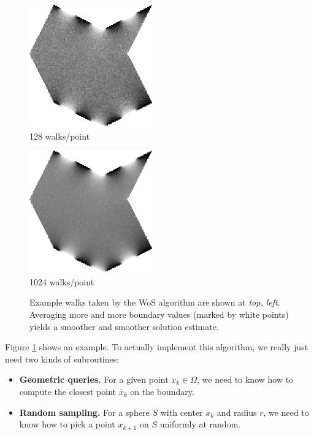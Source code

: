 \documentclass{article}
\newcommand{\figlabel}[1]{\textsf{#1}}
\newcommand{\figloc}[1]{\textit{#1}}
\renewcommand{\vec}[1]{#1}
\begin{document}
\begin{figure}[h!]
   \begin{minipage}{150pt}
      \centering
      \includegraphics[width=150pt]{images/WoSt-128wpp.png} \\
      \figlabel{128 walks/point}
   \end{minipage}
   \begin{minipage}{150pt}
      \centering
      \includegraphics[width=150pt]{images/WoSt-1024wpp.png} \\
      \figlabel{1024 walks/point}
   \end{minipage}
   \caption{Example walks taken by the WoS algorithm are shown at \figloc{top, left}.  Averaging more and more boundary values (marked by white points) yields a smoother and smoother solution estimate.\label{fig:WoSExample}}
\end{figure}

Figure \ref{fig:WoSExample} shows an example.  To actually implement this algorithm, we really just need two kinds of subroutines:
\begin{itemize}
   \item \textbf{Geometric queries.}  For a given point \(\vec{x}_k \in \Omega\), we need to know how to compute the closest point \(\overline{\vec{x}}_k\) on the boundary.
   \item \textbf{Random sampling.} For a sphere \(S\) with center \(\vec{x}_k\) and radius \(r\), we need to know how to pick a point \(\vec{x}_{k+1}\) on \(S\) uniformly at random.
\end{itemize}
\end{document}
